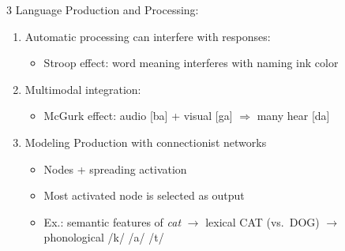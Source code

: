 \documentclass[12pt, a4paper]{article}
\begin{document}
\begin{multicols*}{3}
Language Production and Processing:
\begin{enumerate}[\roman*.]
  \item Automatic processing can interfere with responses:
    \begin{itemize}[leftmargin=*]\vspace{3pt}
      \item Stroop effect: word meaning interferes with naming ink color
    \end{itemize}
  \item Multimodal integration:
    \begin{itemize}[leftmargin=*]\vspace{3pt}
      \item McGurk effect: audio [ba] + visual [ga] $\Rightarrow$ many hear [da]
    \end{itemize}
  \item Modeling Production with connectionist networks 
    \begin{itemize}[leftmargin=*]\vspace{3pt}
      \item Nodes + spreading activation
      \item Most activated node is selected as output
      \item Ex.: semantic features of \textit{cat} $\rightarrow$ lexical CAT (vs.\ DOG) $\rightarrow$ phonological /k/ /a/ /t/
    \end{itemize}
\end{enumerate}


\end{multicols*}
\end{document}
